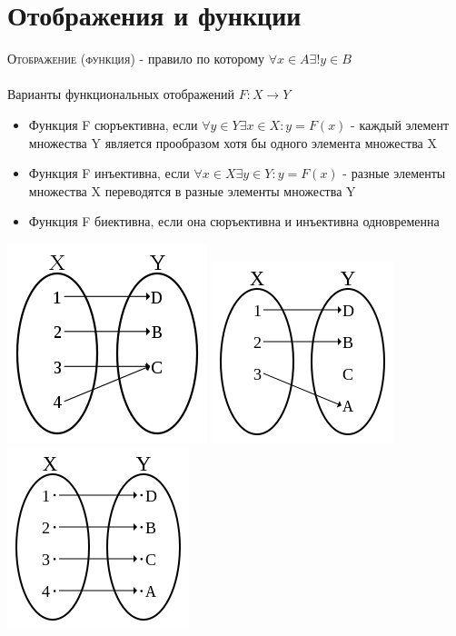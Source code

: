 \documentclass[14pt]{article}
\begin{document}
    \section{Отображения и функции}
        \textsc{Отображение (функция) } - правило по которому $ \forall x \in A \exists ! y \in B $ \\
        \\
        Варианты функциональных отображений $F : X \rightarrow Y $
        \begin{itemize}
            \item Функция F сюръективна, если $ \forall y \in Y \exists x \in X :y = F(x)$ - каждый элемент множества Y является прообразом хотя бы одного элемента множества X
            \item Функция F инъективна, если $ \forall x \in X \exists y \in Y : y = F(x) $ - разные элементы множества X переводятся в разные элементы множества Y
            \item Функция F биективна, если она сюръективна и инъективна одновременна
        \end{itemize}
        \begin{center}
            \includegraphics[scale=0.27]{2-1} 
            \includegraphics[scale=0.3]{2-2}
            \includegraphics[scale=0.3]{2-3}    
        \end{center}
        
\end{document}
